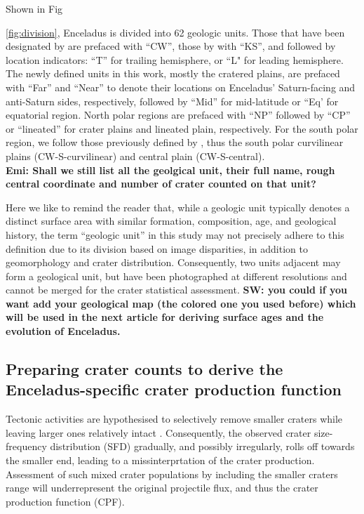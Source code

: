\documentclass[preprint,11pt,3p,times,authoryear]{elsarticle}
\begin{document}
Shown in Fig~{\ref{fig:division}, Enceladus is divided into 62 geologic units. Those that have been designated by \citet{CrowWillard2015} are prefaced with ``CW'', those by \citet{Kirchoff2009} with ``KS'', and followed by location indicators: ``T'' for trailing hemisphere, or ``L" for leading hemisphere. The newly defined units in this work, mostly the cratered plains, are prefaced with ``Far'' and ``Near'' to denote their locations on Enceladus' Saturn-facing and anti-Saturn sides, respectively, followed by ``Mid'' for mid-latitude or ``Eq’ for equatorial region. North polar regions are prefaced with ``NP'' followed by ``CP'' or ``lineated'' for crater plains and lineated plain, respectively. For the south polar region, we follow those previously defined by \citet{CrowWillard2015}, thus the south polar curvilinear plains (CW-S-curvilinear) and central plain (CW-S-central). \\
\textbf{Emi: Shall we still list all the geolgical unit, their full name, rough central coordinate and number of crater counted on that unit?}

Here we like to remind the reader that, while a geologic unit typically denotes a distinct surface area with similar formation, composition, age, and geological history, the term ``geologic unit'' in this study may not precisely adhere to this definition due to its division based on image disparities, in addition to geomorphology and crater distribution. Consequently, two units adjacent may form a geological unit, but have been photographed at different resolutions and cannot be merged for the crater statistical assessment.
\textbf{SW: you could if you want add your geological map (the colored one you used before) which will be used in the next article for deriving surface ages and the evolution of Enceladus.}

\subsection{Preparing crater counts to derive the Enceladus-specific crater production function}
\label{subsec:cpf}
Tectonic activities are hypothesised to selectively remove smaller craters while leaving larger ones relatively intact \citep{Michael2010}. Consequently, the observed crater size-frequency distribution (SFD) gradually, and possibly irregularly, rolls off towards the smaller end, leading to a missinterprtation of the crater production.
Assessment of such mixed crater populations by including the smaller craters range will underrepresent the original projectile flux, and thus the crater production function (CPF).

}
\end{document}
